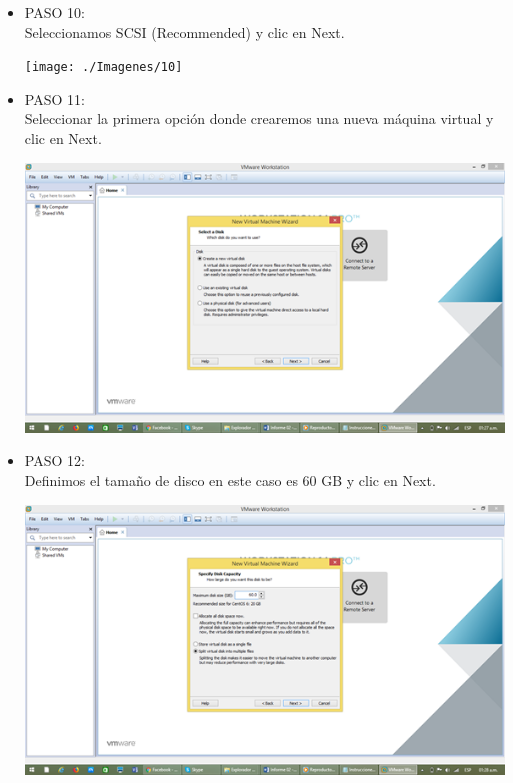 	\begin{itemize}
\item PASO 10:
\\Seleccionamos SCSI (Recommended) y clic en Next.
		\begin{center}
		\texttt{[image: ./Imagenes/10]}
		\end{center}
	

	\end{itemize} 

	\begin{itemize}
\item PASO 11:
\\Seleccionar la primera opción donde crearemos una nueva máquina virtual y clic en Next.\\
		\begin{center}
		\includegraphics[width=15cm]{./Imagenes/11}
		\end{center}
	

	\end{itemize} 

	\begin{itemize}
\item PASO 12:
\\Definimos el tamaño de disco en este caso es 60 GB y clic en Next.\\
		\begin{center}
		\includegraphics[width=15cm]{./Imagenes/12}
		\end{center}
	

	\end{itemize} 


